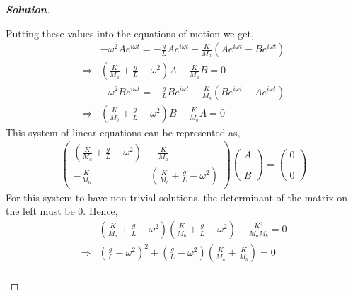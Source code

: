 \documentclass[10pt]{scrartcl}
\theoremstyle{definition}
\newenvironment{solution} {\begin{proof}[\normalfont \textbf{Solution}]} {\end{proof}}
\begin{document}
\begin{solution}
\begin{enumerate}[label={(\alph*)}]
            Putting these values into the equations of motion we get,
            \begin{align*}
                &-\omega^2Ae^{i\omega t} = -\frac{g}{L}Ae^{i \omega t} - \frac{K}{M_a}(Ae^{i \omega t} -Be^{i\omega t}) \\ 
                \Rightarrow &\left(\frac{K}{M_a} + \frac{g}{L} - \omega^2\right)A - \frac{K}{M_a}B = 0
            \end{align*}
            \begin{align*}
                &-\omega^2Be^{i\omega t} = -\frac{g}{L}Be^{i \omega t} - \frac{K}{M_b}(Be^{i \omega t} -Ae^{i\omega t}) \\ 
                \Rightarrow &\left(\frac{K}{M_b} + \frac{g}{L} - \omega^2\right)B - \frac{K}{M_b}A = 0
            \end{align*}
            This system of linear equations can be represented as, 
            \begin{gather*}
                \begin{pmatrix}
                    \left(\frac{K}{M_a} + \frac{g}{L} - \omega^2\right) & -\frac{K}{M_a} \\
                    -\frac{K}{M_b} & \left(\frac{K}{M_b} + \frac{g}{L} - \omega^2\right) 
                \end{pmatrix}
                \begin{pmatrix}
                    A \\ 
                    \\
                    \\
                    B
                \end{pmatrix}
                =
                \begin{pmatrix}
                    0 \\ 
                    \\ 
                    \\
                    0
                \end{pmatrix}
            \end{gather*}
            For this system to have non-trivial solutions, the determinant of the matrix on the left must be 0. Hence,
            \begin{align*}
                &\left(\frac{K}{M_a} + \frac{g}{L} - \omega^2\right)\left(\frac{K}{M_b} + \frac{g}{L} - \omega^2\right) - \frac{K^2}{M_aM_b} = 0 \\ 
                \Rightarrow &\left(\frac{g}{L} - \omega^2\right)^2 + \left(\frac{g}{L} - \omega^2\right)\left(\frac{K}{M_a} + \frac{K}{M_b}\right) = 0 \\

\end{align*}
\end{enumerate}
\end{solution}
\end{document}
